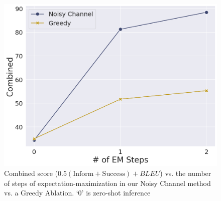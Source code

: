\documentclass[11pt]{article}
\newcommand{\bdk}[1]{}
\begin{document}
\begin{figure}
    \centering
    \includegraphics[width=\columnwidth]{imgs/step_plots_v3/combined_vs_steps.png}
    \caption{Combined score ($0.5(\text{Inform} + \text{Success}) + BLEU$) vs. the number of steps of expectation-maximization in our Noisy Channel method vs. a Greedy Ablation. `0' is zero-shot inference}
    \label{fig:success-v-steps}
\end{figure}

\end{document}
